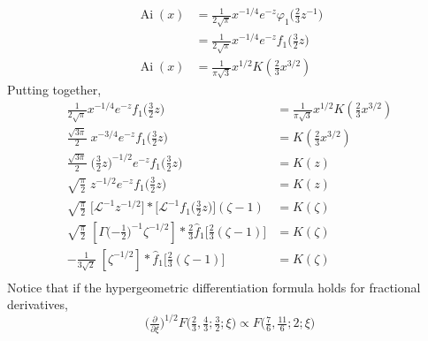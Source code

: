 \documentclass{article}
\newcommand{\laplace}{\mathcal{L}}
\DeclareMathOperator{\Ai}{Ai}
\begin{document}
\begin{align*}
\Ai(x) & = \tfrac{1}{2\sqrt{\pi}} x^{-1/4} e^{-z} \varphi_1\big(\tfrac{2}{3} z^{-1}\big) \\
& = \tfrac{1}{2\sqrt{\pi}} x^{-1/4} e^{-z} f_1\big(\tfrac{3}{2} z\big) \\
\Ai(x) & = \frac{1}{\pi\sqrt{3}} x^{1/2} K(\tfrac{2}{3} x^{3/2})
\end{align*}
Putting together,
\begin{align*}
\tfrac{1}{2\sqrt{\pi}} x^{-1/4} e^{-z} f_1\big(\tfrac{3}{2} z\big) & = \frac{1}{\pi\sqrt{3}} x^{1/2} K(\tfrac{2}{3} x^{3/2}) \\
\tfrac{\sqrt{3\pi}}{2}\;x^{-3/4} e^{-z} f_1\big(\tfrac{3}{2} z\big) & = K(\tfrac{2}{3} x^{3/2}) \\
\tfrac{\sqrt{3\pi}}{2}\;\big(\tfrac{3}{2} z)^{-1/2} e^{-z} f_1\big(\tfrac{3}{2} z\big) & = K(z) \\
\sqrt{\tfrac{\pi}{2}}\;z^{-1/2} e^{-z} f_1\big(\tfrac{3}{2} z\big) & = K(z) \\
\sqrt{\tfrac{\pi}{2}}\;\big[\laplace^{-1} z^{-1/2}\big] * \big[\laplace^{-1} f_1\big(\tfrac{3}{2} z\big)\big](\zeta - 1) & = \hat{K}(\zeta) \\
\sqrt{\tfrac{\pi}{2}}\;\left[\Gamma\big({-\tfrac{1}{2}}\big)^{-1} \zeta^{-1/2}\right] * \tfrac{2}{3} \hat{f}_1\big[\tfrac{2}{3}(\zeta - 1)\big] & = \hat{K}(\zeta) \\
-\tfrac{1}{3\sqrt{2}}\;\left[\zeta^{-1/2}\right] * \hat{f}_1\big[\tfrac{2}{3}(\zeta - 1)\big] & = \hat{K}(\zeta) \\
\end{align*}
Notice that if the hypergeometric differentiation formula holds for fractional derivatives,
\[ \big(\tfrac{\partial}{\partial \xi}\big)^{1/2}F\big(\tfrac{2}{3}, \tfrac{4}{3}; \tfrac{3}{2}; \xi\big) \propto F\big(\tfrac{7}{6}, \tfrac{11}{6}; 2; \xi\big) \]


\end{document}
